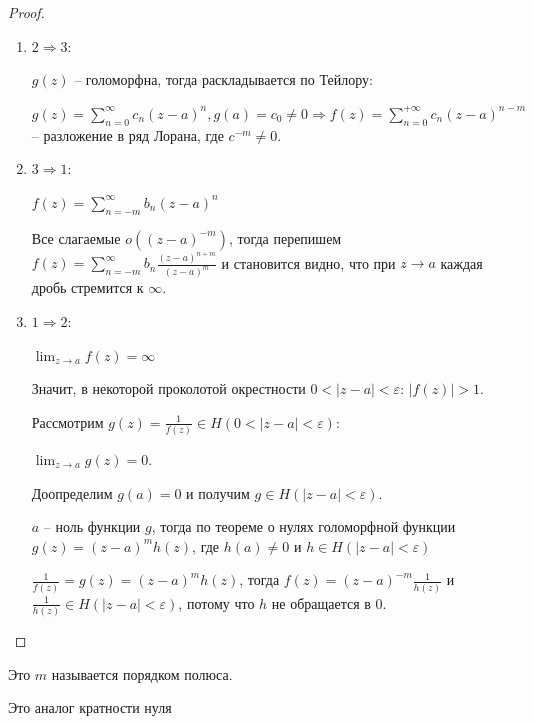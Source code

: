 \begin{proof}
    \begin{enumerate}
        \item {
            $2 \Rightarrow 3$:

            $g(z)$ -- голоморфна, тогда раскладывается по Тейлору:

            $g(z) = \sum_{n=0}^{\infty} c_n (z - a)^n, g(a) = c_0 \neq 0 \Rightarrow f(z) = \sum_{n = 0}^{+\infty} c_n(z - a)^{n - m}$ -- разложение в ряд Лорана, где $c^{-m} \neq 0$.
        }
        \item {
            $3 \Rightarrow 1$:

            $f(z) = \sum_{n = -m}^{\infty} b_n(z - a)^n$

            Все слагаемые $o((z - a)^{-m})$, тогда перепишем $f(z) = \sum_{n=-m}^{\infty} b_n \frac{(z-a)^{n + m}}{(z - a)^{m}}$ и становится видно, что при $z \rightarrow a$ каждая дробь стремится к $\infty$.

        }
        \item {
            $1 \Rightarrow 2$:

            $\lim_{z \to a} f(z) = \infty$

            Значит, в некоторой проколотой окрестности $0 <|z - a| < \varepsilon$:
            $|f(z)| > 1$.

            Рассмотрим $g(z) = \frac{1}{f(z)} \in H(0 < |z - a| < \varepsilon)$:

            $\lim_{z \to a} g(z) = 0$.

            Доопределим $g(a) = 0$ и получим $g \in H(|z - a| < \varepsilon)$.

            $a$ -- ноль функции $g$, тогда по теореме о нулях голоморфной функции $g(z) = (z - a)^m h(z)$, где $h(a) \neq 0$ и $h \in H(|z - a| < \varepsilon)$

            $\frac{1}{f(z)} = g(z) = (z - a)^m h(z)$, тогда $f(z) = (z - a)^{-m} \frac{1}{h(z)}$ и $\frac{1}{h(z)} \in H(|z - a| < \varepsilon)$, потому что $h$ не обращается в $0$.
        }
    \end{enumerate}
\end{proof}

\begin{definition}
    Это $m$ называется порядком полюса.
    \begin{remark}
        Это аналог кратности нуля
    \end{remark}
\end{definition}

